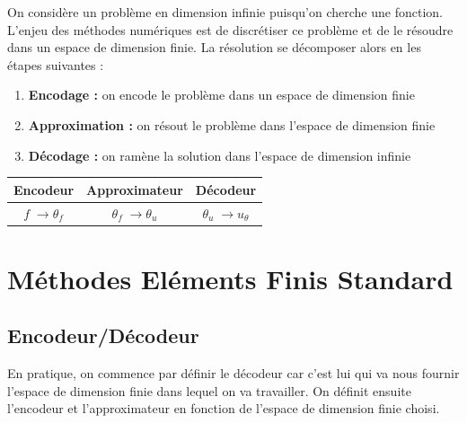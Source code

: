 \documentclass[french]{article}
\begin{document}
	On considère un problème en dimension infinie puisqu'on cherche une fonction. L'enjeu des méthodes numériques est de discrétiser ce problème et de le résoudre dans un espace de dimension finie. La résolution se décomposer alors en les étapes suivantes :
	\begin{enumerate}[label=\textbullet]
		\item \textbf{Encodage :} on encode le problème dans un espace de dimension finie
		\item \textbf{Approximation :} on résout le problème dans l'espace de dimension finie
		\item \textbf{Décodage :} on ramène la solution dans l'espace de dimension infinie
	\end{enumerate}

	\begin{center}
		\begin{tabular}{|c|c|c|}
			\hline
			\textbf{Encodeur} & \textbf{Approximateur} & \textbf{Décodeur} \\
			\hline
			$f \; \rightarrow \theta_f$ & $\theta_f \; \rightarrow \theta_u$ & $\theta_u \; \rightarrow u_\theta$ \\
			\hline
		\end{tabular}
	\end{center}

	\section{Méthodes Eléments Finis Standard}

	\subsection{Encodeur/Décodeur}

	En pratique, on commence par définir le décodeur car c'est lui qui va nous fournir l'espace de dimension finie dans lequel on va travailler. On définit ensuite l'encodeur et l'approximateur en fonction de l'espace de dimension finie choisi.
\end{document}
